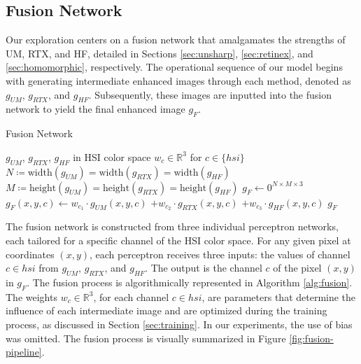 \documentclass[sigconf]{acmart}
\begin{document}
\subsection{Fusion Network}\label{sec:fusion}
Our exploration centers on a fusion network that amalgamates the strengths of UM, RTX, and HF, detailed in Sections \ref{sec:unsharp}, \ref{sec:retinex}, and \ref{sec:homomorphic}, respectively. The operational sequence of our model begins with generating intermediate enhanced images through each method, denoted as $g_{UM}$, $g_{RTX}$, and $g_{HF}$. Subsequently, these images are inputted into the fusion network to yield the final enhanced image $g_{F}$.

\begin{algorithm}
	\caption{Fusion Network}\label{alg:fusion}
	\begin{algorithmic}
	\Require $g_{UM}$, $g_{RTX}$, $g_{HF}$ in HSI color space
	\Require $w_{c} \in \mathbb{R}^3$ for $c \in \{hsi\}$
	\Ensure $N \coloneqq \text{width}(g_{UM}) = \text{width}(g_{RTX}) = \text{width}(g_{HF})$
	\Ensure $M \coloneqq \text{height}(g_{UM}) = \text{height}(g_{RTX}) = \text{height}(g_{HF})$
	\State $g_{F} \gets 0^{N \times M \times 3}$
			\State $g_{F}(x,y,c) \gets w_{c_1} \cdot g_{UM}(x,y,c)$
			\State \qquad \qquad \qquad  $+ w_{c_2} \cdot g_{RTX}(x,y,c)$
			\State \qquad \qquad \qquad $+ w_{c_3} \cdot g_{HF}(x,y,c)$
		\EndFor
	\EndFor
	\State \Return $g_{F}$
	\end{algorithmic}
	\end{algorithm}

The fusion network is constructed from three individual perceptron networks, each tailored for a specific channel of the HSI color space. For any given pixel at coordinates $(x,y)$, each perceptron receives three inputs: the values of channel $c \in {hsi}$ from $g_{UM}$, $g_{RTX}$, and $g_{HF}$. The output is the channel $c$ of the pixel $(x,y)$ in $g_{F}$. The fusion process is algorithmically represented in Algorithm \ref{alg:fusion}. The weights $w_{c} \in \mathbb{R}^3$, for each channel $c \in {hsi}$, are parameters that determine the influence of each intermediate image and are optimized during the training process, as discussed in Section \ref{sec:training}. In our experiments, the use of bias was omitted. The fusion process is visually summarized in Figure \ref{fig:fusion-pipeline}.
\end{document}
